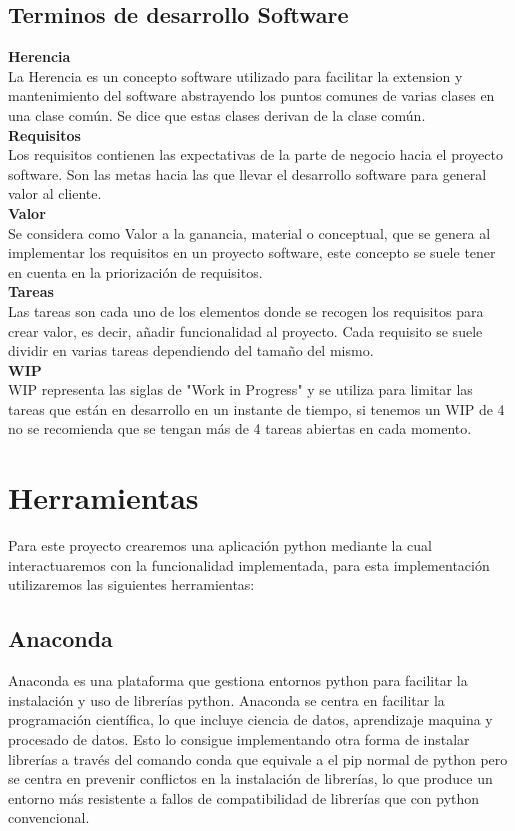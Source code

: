 \documentclass[12pt,a4paper]{article}
\begin{document}
\subsection{Terminos de desarrollo Software}
{\textbf{Herencia}}\\
	La Herencia es un concepto software utilizado para facilitar la extension y mantenimiento del software abstrayendo los puntos comunes de varias clases en una clase común. Se dice que estas clases derivan de la clase común.\\
{\textbf{Requisitos}}\\
	Los requisitos contienen las expectativas de la parte de negocio hacia el proyecto software. Son las metas hacia las que llevar el desarrollo software para general valor al cliente.\\
{\textbf{Valor}}\\
	Se considera como Valor a la ganancia, material o conceptual, que se genera al implementar los requisitos en un proyecto software, este concepto se suele tener en cuenta en la priorización de requisitos.\\
{\textbf{Tareas}}\\
	Las tareas son cada uno de los elementos donde se recogen los requisitos para crear valor, es decir, añadir funcionalidad al proyecto. Cada requisito se suele dividir en varias tareas dependiendo del tamaño del mismo.\\
{\textbf{WIP}}\\
	WIP representa las siglas de "Work in Progress" y se utiliza para limitar las tareas que están en desarrollo en un instante de tiempo, si tenemos un WIP de 4 no se recomienda que se tengan más de 4 tareas abiertas en cada momento.\\


\pagebreak
	\vspace{1cm}
	
	
	\vspace{1cm}
	\section{Herramientas}
	\vspace{1cm}
Para este proyecto crearemos una aplicación python mediante la cual interactuaremos con la funcionalidad implementada, para esta implementación utilizaremos las siguientes herramientas:\\
\subsection{Anaconda}
Anaconda es una plataforma que gestiona entornos python para facilitar la instalación y uso de librerías python. Anaconda se centra en facilitar la programación científica, lo que incluye ciencia de datos, aprendizaje maquina y procesado de datos. Esto lo consigue implementando otra forma de instalar librerías a través del comando conda que equivale a el pip normal de python pero se centra en prevenir conflictos en la instalación de librerías, lo que produce un entorno más resistente a fallos de compatibilidad de librerías que con python convencional.\\
\end{document}

